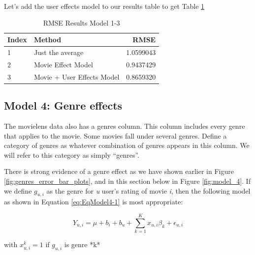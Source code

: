 \documentclass[
]{article}
\begin{document}
Let's add the user effects model to our results table to get Table
\ref{tbl:rmse_results_model_1-3}

\begin{table}[H]

\caption{\label{tab:ue_6}RMSE Results Model 1-3\label{tbl:rmse_results_model_1-3}}
\centering
\fontsize{7}{9}\selectfont
\begin{tabular}[t]{llr}
\toprule
Index & Method & RMSE\\
\midrule
1 & Just the average & 1.0599043\\
2 & Movie Effect Model & 0.9437429\\
3 & Movie + User Effects Model & 0.8659320\\
\bottomrule
\end{tabular}
\end{table}

\newpage

\hypertarget{model-4-genre-effects}{%
\subsection{Model 4: Genre effects}\label{model-4-genre-effects}}

The movielens data also has a genres column. This column includes every
genre that applies to the movie. Some movies fall under several genres.
Define a category of genres as whatever combination of genres appears in
this column. We will refer to this category as simply ``genres''.

There is strong evidence of a genre effect as we have shown earlier in
Figure \ref{fig:genres_error_bar_plots}, and in this section below in
Figure \ref{fig:model_4}. If we define \(g_{u,i}\) as the genre for
\emph{u} user's rating of movie \emph{i}, then the following model as
shown in Equation \ref{eq:EqModel4-1} is most appropriate:

%
\par

\label{eq:EqModel4-1} \begin{equation}
  Y_{u,i} = \mu + b_{i} + b_{u} + \sum_{k=1}^Kx_{u,i}\beta_k + \epsilon_{u,i}
\end{equation}

\begin{center}
with $x_{u,i}^k=1$ if $g_{u,i}$ is genre *k*
\end{center}
\end{document}
